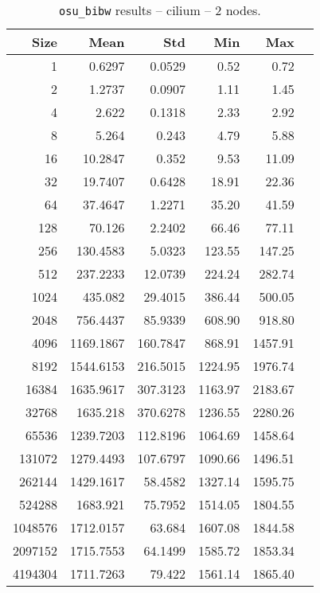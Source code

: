 \begin{table}[htbp]
\begin{minipage}{.48\textwidth}
  \label{tab:bibw-cilium-1nodes}
  \end{minipage}
\hfill
\begin{minipage}{.48\textwidth}
    \centering
    \footnotesize
  \begin{tabular}{rrrrrr}
	\toprule
	\textbf{Size} & \textbf{Mean} & \textbf{Std} & \textbf{Min} & \textbf{Max}	\\
	\midrule
	1	&	0.6297   	&	0.0529	&	0.52	&	0.72	\\
	2	&	1.2737   	&	0.0907	&	1.11	&	1.45	\\
	4	&	2.622   	&	0.1318	&	2.33	&	2.92	\\
	8	&	5.264   	&	0.243	&	4.79	&	5.88	\\
	16	&	10.2847   	&	0.352	&	9.53	&	11.09	\\
	32	&	19.7407   	&	0.6428	&	18.91	&	22.36	\\
	64	&	37.4647   	&	1.2271	&	35.20	&	41.59	\\
	128	&	70.126   	&	2.2402	&	66.46	&	77.11	\\
	256	&	130.4583   	&	5.0323	&	123.55	&	147.25	\\
	512	&	237.2233   	&	12.0739	&	224.24	&	282.74	\\
	1024	&	435.082   	&	29.4015	&	386.44	&	500.05	\\
	2048	&	756.4437   	&	85.9339	&	608.90	&	918.80	\\
	4096	&	1169.1867   	&	160.7847	&	868.91	&	1457.91	\\
	8192	&	1544.6153   	&	216.5015	&	1224.95	&	1976.74	\\
	16384	&	1635.9617   	&	307.3123	&	1163.97	&	2183.67	\\
	32768	&	1635.218   	&	370.6278	&	1236.55	&	2280.26	\\
	65536	&	1239.7203   	&	112.8196	&	1064.69	&	1458.64	\\
	131072	&	1279.4493   	&	107.6797	&	1090.66	&	1496.51	\\
	262144	&	1429.1617   	&	58.4582	&	1327.14	&	1595.75	\\
	524288	&	1683.921   	&	75.7952	&	1514.05	&	1804.55	\\
	1048576	&	1712.0157   	&	63.684	&	1607.08	&	1844.58	\\
	2097152	&	1715.7553   	&	64.1499	&	1585.72	&	1853.34	\\
	4194304	&	1711.7263   	&	79.422	&	1561.14	&	1865.40	\\
	\bottomrule
	\end{tabular}
  \caption{\texttt{osu\_bibw} results -- cilium -- 2 nodes.}
  \label{tab:bibw-cilium-2nodes}
  \end{minipage}
\end{table}
